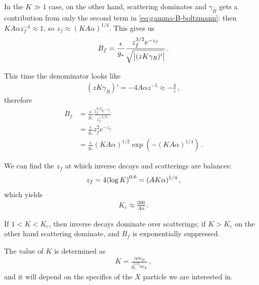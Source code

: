 \documentclass[main.tex]{subfiles}
\begin{document}
In the \(K \gg 1\) case, on the other hand, scattering dominates and \(\gamma _B\) gets a contribution from only the second term in \eqref{eq:gamma-B-boltzmann}: then \(K A \alpha z_f^{-4} \approx 1\), so \(z_f \approx (K A \alpha )^{1/4}\). This gives us 
%
\begin{align}
B_f = \frac{\epsilon}{g_*} \frac{z_f^{3/2} e^{-z_f}}{\sqrt{\abs{(zK \gamma _B)'}}}
\,.
\end{align}

This time the denominator looks like 
%
\begin{align}
(zK \gamma _B)' = -4 A \alpha z^{-5} \approx - \frac{4}{z}
\,,
\end{align}
%
therefore 
%
\begin{align}
B_f &= \frac{\epsilon}{g_*} \frac{z_f^{3/2} e^{-z_f}}{z_f^{-1/2}} \\
&= \frac{\epsilon}{g_*} z_f^2 e^{-z_f}  \\
&= \frac{\epsilon}{g_*} (K A \alpha )^{1/2} \exp(- (K A \alpha )^{1/4})
\,.
\end{align}

We can find the \(z_f\) at which inverse decays and scatterings are balances: 
%
\begin{align}
z_f = 4 \qty(\log K)^{\num{.6}} = (A K \alpha )^{1/4}
\,,
\end{align}
%
which yields 
%
\begin{align}
K_c \approx \frac{300}{A \alpha }
\,.
\end{align}

If \(1 < K < K_c\), then inverse decays dominate over scatterings; if \(K > K_c\) on the other hand scattering dominate, and \(B_f\) is exponentially suppressed. 

The value of \(K\) is determined as 
%
\begin{align}
K = \frac{\alpha m_P}{g_*^{1/2} m_X}
\,,
\end{align}
%
and it will depend on the specifics of the \(X\) particle we are interested in. 
\end{document}

